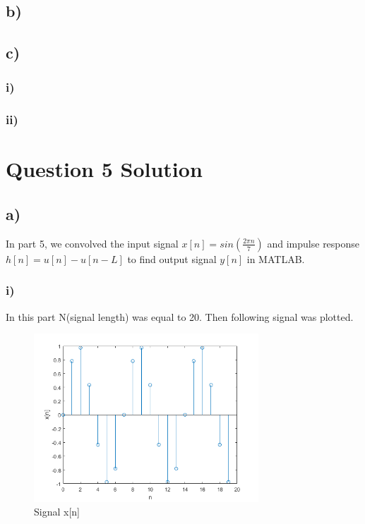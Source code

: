 \documentclass[letterpaper,12pt]{article}
\begin{document}
\subsection{b)}
\subsection{c)}

\subsubsection{i)}

\subsubsection{ii)}
\section{Question 5 Solution}
\subsection{a)}
In part 5, we convolved the input signal \(x[n] = sin(\frac{2\pi n}{7} )\) and impulse response \(h[n] = u[n] - u[n-L]\) to find output signal \(y[n]\) in MATLAB.
\subsubsection{i)}
In this part N(signal length) was equal to 20. Then following signal was plotted.
\begin{figure}[H]
    \centering
    \includegraphics[width = 0.75\textwidth]{i.png}
    \caption{Signal x[n]}
    \end{figure} 
    
\end{document}
